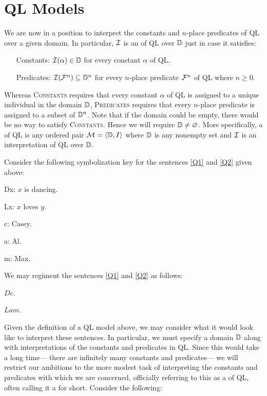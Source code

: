 \section{QL Models}
\label{ch9.ModelsQL}

We are now in a position to interpret the constants and $n$-place predicates of QL over a given domain.
In particular, $\mathcal{I}$ is an  of QL over $\mathbb{D}$ just in case it satisfies:

\begin{enumerate}[leftmargin=1.5in]
  \item[\sc Constants:] $\mathcal{I}(\alpha)\in\mathbb{D}$ for every constant $\alpha$ of QL. 
  \item[\sc Predicates:] $\mathcal{I}(\mathcal{F}^n)\subseteq\mathbb{D}^n$ for every $n$-place predicate $\mathcal{F}^n$ of QL where $n\geq 0$.
\end{enumerate}

Whereas \textsc{Constants} requires that every constant $\alpha$ of QL is assigned to a unique individual in the domain $\mathbb{D}$, \textsc{Predicates} requires that every $n$-place predicate is assigned to a subset of $\mathbb{D}^n$.
Note that if the domain could be empty, there would be no way to satisfy \textsc{Constants}.
Hence we will require $\mathbb{D}\neq\varnothing$.
More specifically, a  of QL is any ordered pair $\mathcal{M}=\langle\mathbb{D},I\rangle$ where $\mathbb{D}$ is any nonempty set and $\mathcal{I}$ is an interpretation of QL over $\mathbb{D}$.

Consider the following symbolization key for the sentences \ref{Q1} and \ref{Q2} given above:

\begin{ekey}
  \item[Dx:] $x$ is dancing. 
  \item[Lx:] $x$ loves $y$.
  \item[c:] Casey.
  \item[a:] Al.
  \item[m:] Max.
\end{ekey}

We may regiment the sentences \ref{Q1} and \ref{Q2} as follows:

\begin{earg}
  \item[\ex{RQ1}] $Dc$.
  \item[\ex{RQ2}] $Lam$.
\end{earg}

Given the definition of a QL model above, we may consider what it would look like to interpret these sentences.
In particular, we must specify a domain $\mathbb{D}$ along with interpretations of the constants and predicates in QL.
Since this would take a long time--- there are infinitely many constants and predicates--- we will restrict our ambitions to the more modest task of interpreting the constants and predicates with which we are concerned, officially referring to this as a  of QL, often calling it a  for short.
Consider the following:

